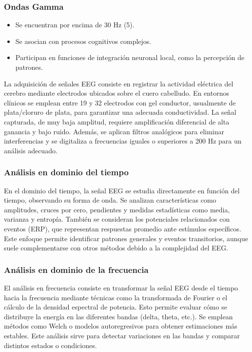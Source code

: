 \documentclass[12pt,letterpaper]{article}
\begin{document}
\subsubsection{Ondas Gamma}

\begin{itemize}
    \item Se encuentran por encima de 30 Hz (5).
    \item Se asocian con procesos cognitivos complejos.
    \item Participan en funciones de integración neuronal local, como la percepción de patrones.
\end{itemize}
\cite{noauthor_normal_2019}

La adquisición de señales EEG consiste en registrar la actividad eléctrica del cerebro mediante electrodos ubicados sobre el cuero cabelludo. En entornos clínicos se emplean entre 19 y 32 electrodos con gel conductor, usualmente de plata/cloruro de plata, para garantizar una adecuada conductividad. La señal capturada, de muy baja amplitud, requiere amplificación diferencial de alta ganancia y bajo ruido. Además, se aplican filtros analógicos para eliminar interferencias y se digitaliza a frecuencias iguales o superiores a 200 Hz para un análisis adecuado.

\cite{bayat_comprehensive_2026}

\subsubsection{Análisis en dominio del tiempo}

En el dominio del tiempo, la señal EEG se estudia directamente en función del tiempo, observando su forma de onda. Se analizan características como amplitudes, cruces por cero, pendientes y medidas estadísticas como media, varianza y entropía. También se consideran los potenciales relacionados con eventos (ERP), que representan respuestas promedio ante estímulos específicos. Este enfoque permite identificar patrones generales y eventos transitorios, aunque suele complementarse con otros métodos debido a la complejidad del EEG.

\subsubsection{Análisis en dominio de la frecuencia}

El análisis en frecuencia consiste en transformar la señal EEG desde el tiempo hacia la frecuencia mediante técnicas como la transformada de Fourier o el cálculo de la densidad espectral de potencia. Esto permite evaluar cómo se distribuye la energía en las diferentes bandas (delta, theta, etc.). Se emplean métodos como Welch o modelos autoregresivos para obtener estimaciones más estables. Este análisis sirve para detectar variaciones en las bandas y comparar distintos estados o condiciones.
\end{document}
